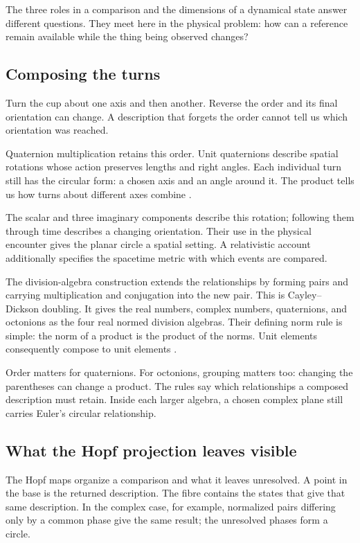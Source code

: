 \documentclass[11pt,a4paper]{article}
\theoremstyle{definition}
\begin{document}
The three roles in a comparison and the dimensions of a dynamical
state answer different questions. They meet here in the physical
problem: how can a reference remain available while the thing being
observed changes?

\subsection{Composing the turns}

Turn the cup about one axis and then another. Reverse the order and
its final orientation can change. A description that forgets the
order cannot tell us which orientation was reached.

Quaternion multiplication retains this order. Unit quaternions
describe spatial rotations whose action preserves lengths and right
angles. Each individual turn still has the circular form: a chosen
axis and an angle around it. The product tells us how turns about
different axes combine \citep{Baez2002}.

The scalar and three imaginary components describe this rotation;
following them through time describes a changing orientation. Their
use in the physical encounter gives the planar circle a spatial
setting. A relativistic account additionally specifies the spacetime
metric with which events are compared.

The division-algebra construction extends the relationships by
forming pairs and carrying multiplication and conjugation into the
new pair. This is Cayley--Dickson doubling. It gives the real numbers,
complex numbers, quaternions, and octonions as the four real normed
division algebras. Their defining norm rule is simple: the norm of
a product is the product of the norms. Unit elements consequently
compose to unit elements \citep{Baez2002}.

Order matters for quaternions. For octonions, grouping matters too:
changing the parentheses can change a product. The rules say which
relationships a composed description must retain. Inside each
larger algebra, a chosen complex plane still carries Euler's circular
relationship.

\subsection{What the Hopf projection leaves visible}

The Hopf maps organize a comparison and what it leaves unresolved.
A point in the base is the returned description. The fibre contains
the states that give that same description. In the complex case,
for example, normalized pairs differing only by a common phase give
the same result; the unresolved phases form a circle.
\end{document}
